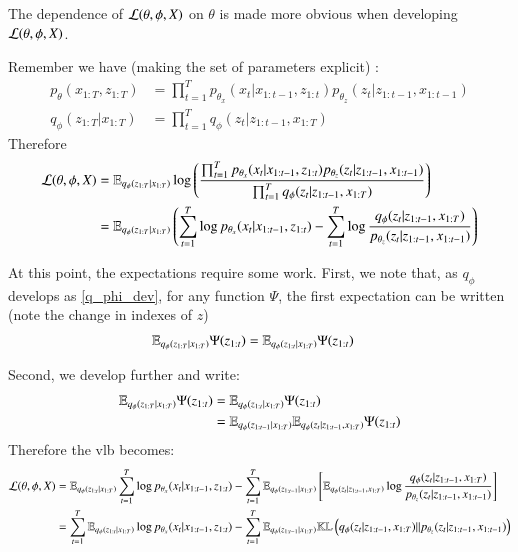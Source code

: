 The dependence of $\mathcal{L}(\theta, \phi, X)$ on $\theta$ is made more obvious when developing $\mathcal{L}(\theta, \phi, X)$.

Remember we have (making the set of parameters explicit) :
\begin{align}
    p_{\theta}(x_{1:T}, z_{1:T}) &= \prod_{t=1}^T p_{\theta_x}(x_t \vert x_{1:t-1}, z_{1:t}) p_{\theta_z}(z_t \vert z_{1:t-1}, x_{1:t-1}) \\
    \label{q_phi_dev}
    q_\phi(z_{1:T} \vert x_{1:T}) &= \prod_{t=1}^T q_\phi (z_t \vert z_{1:t-1}, x_{1:T})
\end{align}
Therefore
\begin{align}
    \mathcal{L}(\theta, \phi, X) &= \mathbb{E}_{q_{\phi}(z_{1:T}\vert x_{1:T})} \log{\left( \frac{\prod_{t=1}^T p_{\theta_x}(x_t \vert x_{1:t-1}, z_{1:t}) p_{\theta_z}(z_t \vert z_{1:t-1}, x_{1:t-1})}{\prod_{t=1}^T q_\phi (z_t \vert z_{1:t-1}, x_{1:T})} \right)} \\
    &= \mathbb{E}_{q_{\phi}(z_{1:T}\vert x_{1:T})} \left(  \sum_{t=1}^T \log{p_{\theta_x}(x_t \vert x_{1:t-1}, z_{1:t})} - \sum_{t=1}^T \log{\frac{q_\phi (z_t \vert z_{1:t-1}, x_{1:T})}{p_{\theta_z}(z_t \vert z_{1:t-1}, x_{1:t-1})}}
    \right)
\end{align}

At this point, the expectations require some work. First, we note that, as $q_\phi$ develops as \ref{q_phi_dev}, for any function $\Psi$, the first expectation can be written (note the change in indexes of $z$)
\begin{align*}
    \mathbb{E}_{q_{\phi}(z_{1:T}\vert x_{1:T})} \Psi(z_{1:t}) &= \mathbb{E}_{q_\phi(z_{1:t} \vert x_{1:T})}\Psi(z_{1:t})
\end{align*}

Second, we develop further and write:
\begin{align*}
    \mathbb{E}_{q_{\phi}(z_{1:T}\vert x_{1:T})} \Psi(z_{1:t}) &= \mathbb{E}_{q_\phi(z_{1:t} \vert x_{1:T})}\Psi(z_{1:t}) \\
    &= \mathbb{E}_{q_\phi(z_{1:t-1} \vert x_{1:T})} \mathbb{E}_{q_\phi(z_t \vert z_{1:t-1}, x_{1:T})} \Psi(z_{1:t})
\end{align*}
Therefore the \gls{vlb} becomes:
\begin{align}
    \mathcal{L}(\theta, \phi, X) &= \mathbb{E}_{q_\phi(z_{1:t} \vert x_{1:T})}\sum_{t=1}^T \log{p_{\theta_x}(x_t \vert x_{1:t-1}, z_{1:t})} - \sum_{t=1}^T \mathbb{E}_{q_\phi(z_{1:t-1} \vert x_{1:T})} \left[ \mathbb{E}_{q_\phi(z_t \vert z_{1:t-1}, x_{1:T})} \log{\frac{q_\phi(z_t \vert z_{1:t-1}, x_{1:T})}{p_{\theta_z}(z_t \vert z_{1:t-1}, x_{1:t-1})}}\right] \\
    &= \sum_{t=1}^T \mathbb{E}_{q_\phi(z_{1:t} \vert x_{1:T})} \log{p_{\theta_x}(x_t \vert x_{1:t-1}, z_{1:t})} - \sum_{t=1}^T \mathbb{E}_{q_\phi(z_{1:t-1} \vert x_{1:T})} \mathbb{KL}\left( q_\phi(z_t \vert z_{1:t-1}, x_{1:T}) \vert\vert p_{\theta_z}(z_t \vert z_{1:t-1}, x_{1:t-1}) \right)
\end{align}

